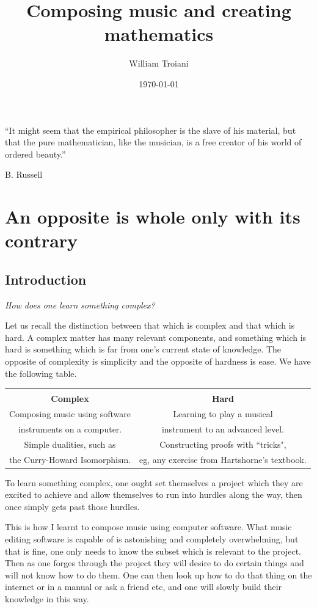\documentclass[12pt]{book}
\title{Composing music and creating mathematics}
\author{William Troiani}
\date{\today}
\theoremstyle{plain}
\theoremstyle{definition}
\begin{document}
	\maketitle
	\setlength{\epigraphwidth}{5in}\epigraph{“It might seem that the empirical philosopher is the slave of his material, but that the pure mathematician, like the musician, is a free creator of his world of ordered beauty.”}{B. Russell}
	\chapter{An opposite is whole only with its contrary}
	\section{Introduction}
	\begin{center}
		\emph{How does one learn something complex?}
		\end{center}
	Let us recall the distinction between that which is complex and that which is hard. A complex matter has many relevant components, and something which is hard is something which is far from one's current state of knowledge. The opposite of complexity is simplicity and the opposite of hardness is ease. We have the following table.
	\begin{center}
	\begin{tabular}{| c | c |}
		\hline\\
		\textbf{Complex} & \textbf{Hard}\\
		\hline
		Composing music using software & Learning to play a musical\\
		instruments on a computer. &instrument to an advanced level.\\
		\hline
		Simple dualities, such as & Constructing proofs with ``tricks",\\ the Curry-Howard Isomorphism. &  eg, any exercise from Hartshorne's textbook.\\
		\hline
		\end{tabular}
	\end{center}
	To learn something complex, one ought set themselves a project which they are excited to achieve and allow themselves to run into hurdles along the way, then once simply gets past those hurdles.
	
	This is how I learnt to compose music using computer software. What music editing software is capable of is astonishing and completely overwhelming, but that is fine, one only needs to know the subset which is relevant to the project. Then as one forges through the project they will desire to do certain things and will not know how to do them. One can then look up how to do that thing on the internet or in a manual or ask a friend etc, and one will slowly build their knowledge in this way.
	
\end{document}
